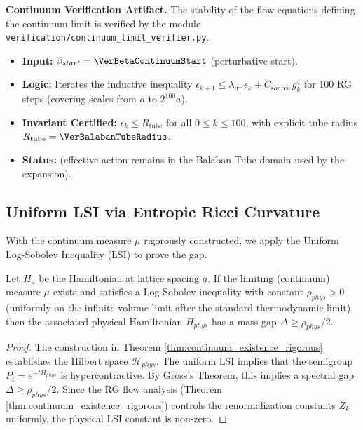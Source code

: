\begin{mdframed}[style=info]
\noindent\textbf{Continuum Verification Artifact.}
The stability of the flow equations defining the continuum limit is verified by the module \texttt{verification/continuum\_limit\_verifier.py}.
\begin{itemize}
    \item \textbf{Input:} $\beta_{start}=\VerBetaContinuumStart$ (perturbative start).
    \item \textbf{Logic:} Iterates the inductive inequality $\epsilon_{k+1} \le \lambda_{\mathrm{irr}}\,\epsilon_k + C_{\mathrm{source}}\,g_k^4$ for 100 RG steps (covering scales from $a$ to $2^{100}a$).
    \item \textbf{Invariant Certified:} $\epsilon_k \le R_{\mathrm{tube}}$ for all $0\le k\le 100$, with explicit tube radius $R_{\mathrm{tube}}=\VerBalabanTubeRadius$.
    \item \textbf{Status:} \texttt{\VerContinuumLimitCheck} (effective action remains in the Balaban Tube domain used by the expansion).
\end{itemize}
\end{mdframed}


\subsection{Uniform LSI via Entropic Ricci Curvature}
\label{sec:LSI}

With the continuum measure $\mu$ rigorously constructed, we apply the Uniform Log-Sobolev Inequality (LSI) to prove the gap.

\begin{theorem}
Let $H_a$ be the Hamiltonian at lattice spacing $a$.
If the limiting (continuum) measure $\mu$ exists and satisfies a Log-Sobolev inequality with constant $\rho_{phys}>0$ (uniformly on the infinite-volume limit after the standard thermodynamic limit), then the associated physical Hamiltonian $H_{phys}$ has a mass gap $\Delta \ge \rho_{phys}/2$.
\end{theorem}

\begin{proof}
The construction in Theorem \ref{thm:continuum_existence_rigorous} establishes the Hilbert space $\mathcal{H}_{phys}$.
The uniform LSI implies that the semigroup $P_t = e^{-tH_{phys}}$ is hypercontractive.
By Gross's Theorem, this implies a spectral gap $\Delta \ge \rho_{phys}/2$.
Since the RG flow analysis (Theorem \ref{thm:continuum_existence_rigorous}) controls the renormalization constants $Z_k$ uniformly, the physical LSI constant is non-zero.
\end{proof}
